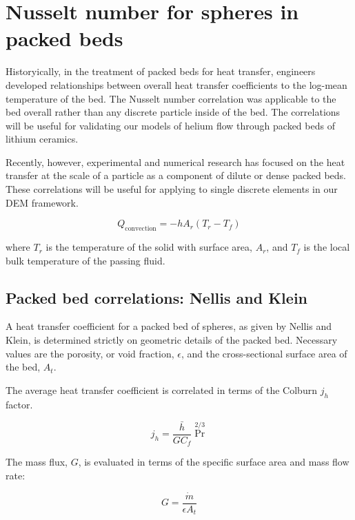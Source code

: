 \section{Nusselt number for spheres in packed beds}\label{sec:particle-convection}

Historyically, in the treatment of packed beds for heat transfer, engineers developed relationships between overall heat transfer coefficients to the log-mean temperature of the bed. The Nusselt number correlation was applicable to the bed overall rather than any discrete particle inside of the bed. The correlations will be useful for validating our models of helium flow through packed beds of lithium ceramics.


Recently, however, experimental and numerical research has focused on the heat transfer at the scale of a particle as a component of dilute or dense packed beds. These correlations will be useful for applying to single discrete elements in our DEM framework.

\begin{equation}
	Q_\text{convection} = -hA_r(T_r-T_f)
\end{equation}

where $T_r$ is the temperature of the solid with surface area, $A_r$, and $T_f$ is the local bulk temperature of the passing fluid.

\subsection{Packed bed correlations: Nellis and Klein}

A heat transfer coefficient for a packed bed of spheres, as given by Nellis and Klein, is determined strictly on geometric details of the packed bed.  Necessary values are the porosity, or void fraction, $\epsilon$, and the cross-sectional surface area of the bed, $A_t$.

The average heat transfer coefficient is correlated in terms of the Colburn $j_h$ factor.

\begin{equation}
	j_h=\frac{\bar{h}}{G C_f} \Pr^{2/3}
\end{equation}

The mass flux, $G$, is evaluated in terms of the specific surface area and mass flow rate:

\begin{equation}
	G=\frac{\dot{m}}{\epsilon A_t}
\end{equation}

